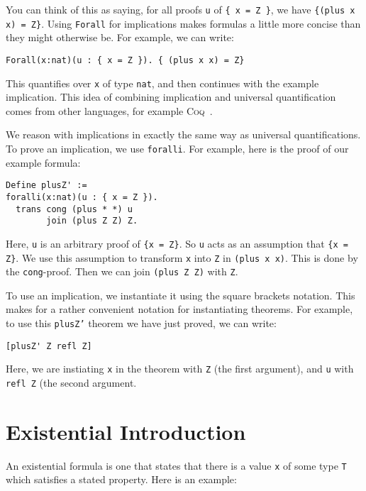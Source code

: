 \documentclass{book}[12pt]
\begin{document}
\noindent You can think of this as saying, for all proofs \texttt{u} of
\texttt{\{ x = Z \}}, we have \texttt{\{(plus x x) = Z\}}.  Using
\texttt{Forall} for implications makes formulas a little more concise
than they might otherwise be.  For example, we can write:

\begin{verbatim}
Forall(x:nat)(u : { x = Z }). { (plus x x) = Z}
\end{verbatim}

\noindent This quantifies over \texttt{x} of type \texttt{nat}, and
then continues with the example implication.  This idea of combining
implication and universal quantification comes from other languages,
for example \textsc{Coq}~\cite{coq}.

We reason with implications in exactly the same way as universal
quantifications.  To prove an implication, we use \texttt{foralli}.
For example, here is the proof of our example formula:

\begin{verbatim}
Define plusZ' :=
foralli(x:nat)(u : { x = Z }). 
  trans cong (plus * *) u
        join (plus Z Z) Z.
\end{verbatim}

\noindent Here, \texttt{u} is an arbitrary proof of \texttt{\{x =
Z\}}.  So \texttt{u} acts as an assumption that \texttt{\{x = Z\}}.
We use this assumption to transform \texttt{x} into \texttt{Z} in
\texttt{(plus x x)}.  This is done by the \texttt{cong}-proof.  Then
we can join \texttt{(plus Z Z)} with \texttt{Z}.

To use an implication, we instantiate it using the square brackets
notation.  This makes for a rather convenient notation for
instantiating theorems.  For example, to use this \texttt{plusZ'}
theorem we have just proved, we can write:

\begin{verbatim}
[plusZ' Z refl Z]
\end{verbatim}

\noindent Here, we are instiating \texttt{x} in the theorem with
\texttt{Z} (the first argument), and \texttt{u} with \texttt{refl Z}
(the second argument.

\section{Existential Introduction}

An existential formula is one that states that there is a value
\texttt{x} of some type \texttt{T} which satisfies a stated property.
Here is an example:
\end{document}
